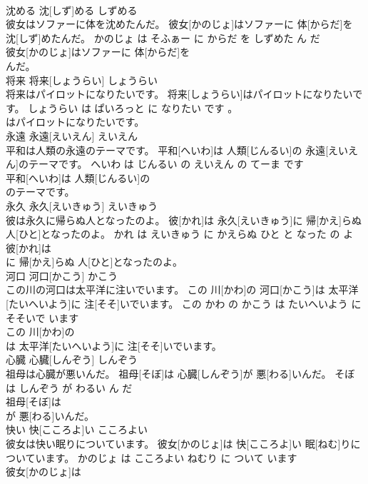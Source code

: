 \documentclass[8pt]{extreport}
\begin{document}
\begin{CJK}{UTF8}{min}
\\	沈める	沈[しず]める	しずめる	
\\	彼女はソファーに体を沈めたんだ。	彼女[かのじょ]はソファーに 体[からだ]を 沈[しず]めたんだ。	かのじょ は そふぁー に からだ を しずめた ん だ	
\\	彼女[かのじょ]はソファーに 体[からだ]を
\\	んだ。			
\\	将来	将来[しょうらい]	しょうらい	
\\	将来はパイロットになりたいです。	将来[しょうらい]はパイロットになりたいです。	しょうらい は ぱいろっと に なりたい です 。	
\\	はパイロットになりたいです。			
\\	永遠	永遠[えいえん]	えいえん	
\\	平和は人類の永遠のテーマです。	平和[へいわ]は 人類[じんるい]の 永遠[えいえん]のテーマです。	へいわ は じんるい の えいえん の てーま です	
\\	平和[へいわ]は 人類[じんるい]の
\\	のテーマです。			
\\	永久	永久[えいきゅう]	えいきゅう	
\\	彼は永久に帰らぬ人となったのよ。	彼[かれ]は 永久[えいきゅう]に 帰[かえ]らぬ 人[ひと]となったのよ。	かれ は えいきゅう に かえらぬ ひと と なった の よ	
\\	彼[かれ]は
\\	に 帰[かえ]らぬ 人[ひと]となったのよ。			
\\	河口	河口[かこう]	かこう	
\\	この川の河口は太平洋に注いでいます。	この 川[かわ]の 河口[かこう]は 太平洋[たいへいよう]に 注[そそ]いでいます。	この かわ の かこう は たいへいよう に そそいで います	
\\	この 川[かわ]の
\\	は 太平洋[たいへいよう]に 注[そそ]いでいます。			
\\	心臓	心臓[しんぞう]	しんぞう	
\\	祖母は心臓が悪いんだ。	祖母[そぼ]は 心臓[しんぞう]が 悪[わる]いんだ。	そぼ は しんぞう が わるい ん だ	
\\	祖母[そぼ]は
\\	が 悪[わる]いんだ。			
\\	快い	快[こころよ]い	こころよい	
\\	彼女は快い眠りについています。	彼女[かのじょ]は 快[こころよ]い 眠[ねむ]りについています。	かのじょ は こころよい ねむり に ついて います	
\\	彼女[かのじょ]は

\end{CJK}
\end{document}

